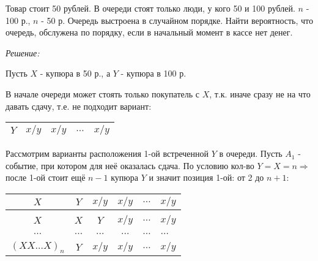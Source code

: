 Товар стоит 50 рублей. В очереди стоят только люди, у кого 50 и 100 рублей. $n$ - 100 р., $n$ - 50 р. Очередь выстроена в случайном порядке. Найти вероятность, что очередь, обслужена по порядку, если в начальный момент в кассе нет денег.

\textit{Решение:}

Пусть $X$ - купюра в 50 р., а $Y$ - купюра в 100 р.

В начале очереди может стоять только покупатель с $X$, т.к. иначе сразу не на что давать сдачу, т.е. не подходит вариант:

\begin{table}[h!]
	\begin{tabular}{|l|l|l|l|l|}
		$Y$ & $x/y$ & $x/y$ & $\dots$ & $x/y$ \\ \hline
	\end{tabular}
\end{table}

Рассмотрим варианты расположения 1-ой встреченной $Y$ в очереди. Пусть $A_1$ - событие, при котором для неё оказалась сдача. По условию кол-во $Y = X = n \Rightarrow$ после 1-ой стоит ещё $n-1$ купюра $Y$ и значит позиция 1-ой: от 2 до $n+1$:

\begin{table}[H]
	\begin{tabular}{cccccl}
		\multicolumn{1}{|c|}{$X$}                & \multicolumn{1}{c|}{$Y$}     & \multicolumn{1}{c|}{$x/y$}   & \multicolumn{1}{c|}{$x/y$}   & \multicolumn{1}{c|}{$\dots$} & \multicolumn{1}{l|}{$x/y$}   \\ \hline
		&                              &                              &                              &                              &                              \\
		\multicolumn{1}{|c|}{$X$}                & \multicolumn{1}{c|}{$X$}     & \multicolumn{1}{c|}{$Y$}     & \multicolumn{1}{c|}{$x/y$}   & \multicolumn{1}{c|}{$\dots$} & \multicolumn{1}{l|}{$x/y$}   \\ \hline
		&                              &                              &                              &                              &                              \\
		\multicolumn{1}{|c|}{$\dots$}            & \multicolumn{1}{c|}{$\dots$} & \multicolumn{1}{c|}{$\dots$} & \multicolumn{1}{c|}{$\dots$} & \multicolumn{1}{c|}{$\dots$} & \multicolumn{1}{l|}{$\dots$} \\ \hline
		&                              &                              &                              &                              &                              \\
		\multicolumn{1}{|c|}{$(XX \dots X)_{n}$} & \multicolumn{1}{c|}{$Y$}     & \multicolumn{1}{c|}{$x/y$}   & \multicolumn{1}{c|}{$x/y$}   & \multicolumn{1}{c|}{$\dots$} & \multicolumn{1}{l|}{$x/y$}   \\ \hline
	\end{tabular}
\end{table}

